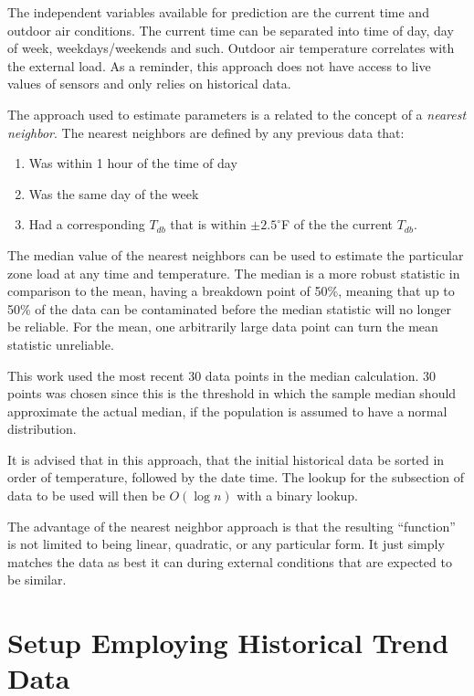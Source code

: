 The independent variables available for prediction are the current time and
outdoor air conditions. The current time can be separated into time of day, day
of week, weekdays/weekends and such. Outdoor air temperature correlates with
the external load. As a reminder, this approach does not have access to live values
of sensors and only relies on historical data.

The approach used to estimate parameters is a related to the concept of
a \textit{nearest neighbor}. The nearest neighbors are defined by any 
previous data that:

\begin{enumerate}
\item Was within 1 hour of the time of day 
\item Was the same day of the week
\item Had a corresponding \(T_{db}\) that is within \(\pm 2.5^\circ\)F of the the current \(T_{db}\). 
\end{enumerate}

The median value of the nearest neighbors can be used to estimate the
particular zone load at any time and temperature.  The median is a more robust
statistic in comparison to the mean, having a breakdown point of 50\%, meaning
that up to 50\% of the data can be contaminated before the median statistic
will no longer be reliable. For the mean, one arbitrarily large data point can
turn the mean statistic unreliable. 

This work used the most recent 30 data points in the median calculation. 30 points 
was chosen since this is the threshold in which the sample median should approximate
the actual median, if the population is assumed to have a normal distribution. 

It is advised that in this approach, that the initial historical data be sorted
in order of temperature, followed by the date time.  The lookup for the
subsection of data to be used will then be \(O\left(\log n \right)\) with a
binary lookup. 

The advantage of the nearest neighbor approach is that the resulting ``function''
is not limited to being linear, quadratic, or any particular form. It just
simply matches the data as best it can during external conditions that are
expected to be similar.

\section{Setup Employing Historical Trend Data}

